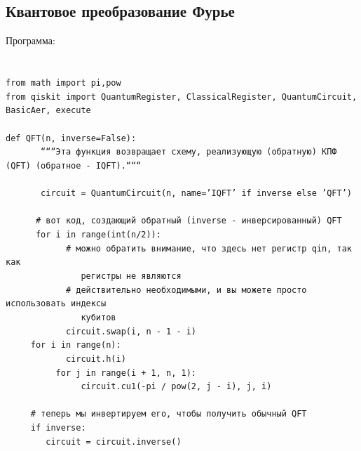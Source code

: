 \documentclass[12pt,a4paper]{article}
\begin{document}
		\subsection{Квантовое преобразование Фурье}
		Программа:\\
		\hspace{1em}\\
		\hspace{1em}\\
		\texttt{from math import  pi,pow\\
			from qiskit import QuantumRegister, ClassicalRegister, QuantumCircuit, BasicAer, execute\\
			\hspace{1em}\\
			def  QFT(n, inverse=False):\\
			~~~~~~~``````Эта функция возвращает схему, реализующую (обратную) КПФ (QFT) (обратное - IQFT).``````\\
			\hspace{1em}\\
			~~~~~~~circuit = QuantumCircuit(n, name='IQFT' if inverse else 'QFT')\\
			\hspace{1em}\\
			~~~~~~\# вот код, создающий обратный (inverse - инверсированный) QFT\\
			~~~~~~for i in range(int(n/2)):\\
			~~~~~~~~~~~~\# можно обратить внимание, что здесь нет регистр qin, так как\\~~~~~~~~~~~~~~~регистры не являются\\
			~~~~~~~~~~~~\# действительно необходимыми, и вы можете просто использовать индексы\\~~~~~~~~~~~~~~~кубитов\\
			~~~~~~~~~~~~circuit.swap(i, n - 1 - i)\\
			~~~~~for i in range(n):\\
			~~~~~~~~~~~~circuit.h(i)\\
			~~~~~~~~~~for j in range(i + 1, n, 1):\\
			~~~~~~~~~~~~~~~circuit.cu1(-pi / pow(2, j - i), j, i)\\
			\hspace{1em}\\
			~~~~~\# теперь мы инвертируем его, чтобы получить обычный QFT\\
			~~~~~if inverse:\\
			~~~~~~~~circuit = circuit.inverse()\\
}
\end{document}
